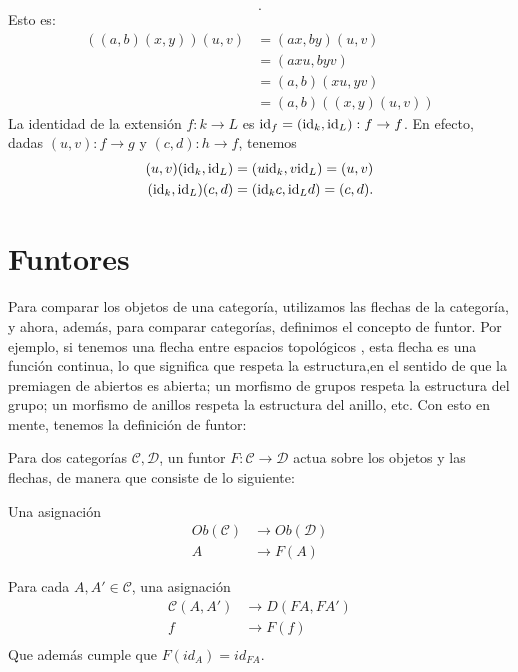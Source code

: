 \begin{exa}
\begin{itemize}
\[    .\]
    Esto es:
    \begin{align*}
        ((a,b)(x,y))(u,v)
        &= (ax,by)(u,v) \\
        &= (axu,byv) \\
        &= (a,b)(xu,yv) \\
        &= (a,b)((x,y)(u,v))
    \end{align*}
    La identidad de la extensión $f:k\to L$ es
    $\mathrm{id}_f = (\mathrm{id}_k,\mathrm{id}_L):f\to f$.
    En efecto, dadas $(u,v):f\to g$ y $(c,d):h\to f$, tenemos
    \begin{align*}
        (u,v)(\mathrm{id}_k,\mathrm{id}_L) &= (u \mathrm{id}_k,v \mathrm{id}_L) = (u,v) \\
        (\mathrm{id}_k,\mathrm{id}_L)(c,d) &= (\mathrm{id}_k c,\mathrm{id}_L d) = (c,d).
    \end{align*}
\end{itemize}
\end{exa}


\section{Funtores}
    Para comparar los objetos de una categoría, utilizamos las
    flechas de la categoría, y ahora, además, para comparar
    categorías, definimos el concepto de funtor.
    Por ejemplo, si tenemos una flecha entre espacios topológicos
    , esta flecha es una función continua, lo que significa que
    respeta la estructura,en el sentido de que la premiagen de
    abiertos es abierta; un morfismo de grupos respeta la
    estructura del grupo; un morfismo de anillos respeta la
    estructura del anillo, etc.
    Con esto en mente, tenemos la definición de funtor:
    \begin{defn}[Funtor]
        Para dos categorías $\mathcal{C,D}$, un funtor $F:\mathcal{C\to D}$ actua sobre los objetos y las flechas, de manera que consiste de lo siguiente:
        \item Una asignación 
            \begin{align*}
                Ob(\mathcal{C}) & \longrightarrow Ob(\mathcal{D}) \\
                A & \to F(A)
            \end{align*}
        \item Para cada $A,A'\in \mathcal{C}$, una asignación
            \begin{align*}
                \mathcal{C}(A,A') & \longrightarrow D(FA,FA') \\
                f & \to F(f) \\
            \end{align*}
        Que además cumple que $F(id_A)=id_{FA}$. 
    \end{defn}
    
